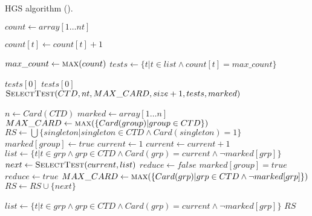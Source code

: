 \clearpage

\begin{algorithm}[ht!]
\caption{HGS algorithm (\cite{hgs}).}
\label{alg:hgs}
\begin{algorithmic}[1]
	
		\State $count\gets array[1 \dots nt]$ 
		
					\State $count[t] \gets count[t] + 1$
				\EndIf
			\EndFor
		\EndFor
		
		\State $max\_count \gets \Call{max}{count}$
		\State $tests \gets \{t \vert t \in list \wedge count[t] = max\_count\}$
		
			\Return $tests[0]$
			\Return $tests[0]$
		\Else{}
			\Return $\Call{SelectTest}{CTD, nt, MAX\_CARD, size + 1, tests, marked}$
		\EndIf
	\EndFunction
	
		\State $n \gets Card(CTD)$
		\State $marked \gets array[1 \dots n]$ 
		\State $MAX\_CARD \gets \Call{max}{\{Card(group) \vert group \in CTD\}}$
		\State $RS \gets \bigcup \{ singleton \vert singleton \in CTD \wedge Card(singleton) = 1 \}$
				\State $marked[group] \gets true$
			\EndIf
		\EndFor
		\State $current \gets 1$
			\State $current \gets current + 1$
			\State $list \gets \{t \vert t \in grp \wedge grp \in CTD \wedge Card(grp) = current \wedge \neg marked[grp]\}$
				\State $next \gets \Call{SelectTest}{current, list}$
				\State $reduce \gets false$
						\State $marked[group] = true$
							\State $reduce \gets true$
						\EndIf
					\EndIf
				\EndFor
					\State $MAX\_CARD \gets \Call{max}{\{Card(grp) \vert grp \in CTD \wedge \neg marked[grp]\}}$
				\EndIf
				\State $RS \gets RS \cup \{next\}$
				
				\State $list \gets \{t \vert t \in grp \wedge grp \in CTD \wedge Card(grp) = current \wedge \neg marked[grp]\}$
			\EndWhile
		\EndWhile
		\State \Return $RS$
	\EndProcedure
\end{algorithmic}
\end{algorithm}